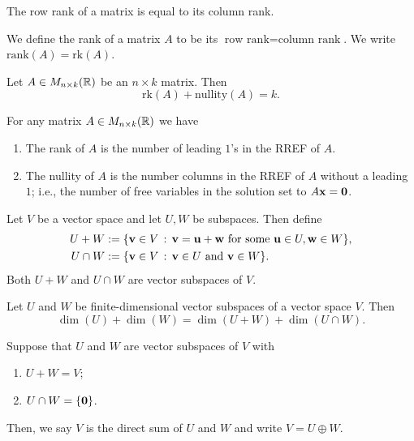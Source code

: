 \documentclass[10pt, a4paper]{article}
\begin{document}
\begin{theorem}
    The row rank of a matrix is equal to its column rank.
\end{theorem}

\begin{definition}[Rank]
    We define the rank of a matrix $A$ to be its $\text{row rank} = \text{column rank}$.
    We write $\mathrm{rank}(A) = \mathrm{rk}(A)$.
\end{definition}

\begin{theorem}
    Let $A \in M_{n \times k}(\mathbb{R})$ be an $n \times k$ matrix.
    Then
    \[
    \mathrm{rk}(A) + \mathrm{nullity}(A) = k.
    \]
\end{theorem}

\begin{corollary}
    For any matrix $A \in M_{n \times k}(\mathbb{R})$ we have
    \begin{enumerate}[label = (\roman*)]
        \item The rank of $A$ is the number of leading $1$'s in the RREF of $A$.
        \item The nullity of $A$ is the number columns in the RREF of $A$ without a leading $1$;
        i.e.,
        the number of free variables in the solution set to $A\mathbf{x} = \mathbf{0}$.
    \end{enumerate}
\end{corollary}

\begin{definition}
    Let $V$ be a vector space and let $U, W$ be subspaces.
    Then define
    \begin{align*}
        U + W &:= \{\mathbf{v} \in V\,:\, \mathbf{v} = \mathbf{u + w}\text{ for some }\mathbf{u} \in U, \mathbf{w} \in W\}, \\
        U \cap W &:= \{\mathbf{v} \in V\,:\, \mathbf{v} \in U\text{ and } \mathbf{v} \in W\}.
    \end{align*}
    Both $U + W$ and $U \cap W$ are vector subspaces of $V$.
\end{definition}

\begin{proposition}
    Let $U$ and $W$ be finite-dimensional vector subspaces of a vector space $V$.
    Then
    \[
    \dim(U) + \dim(W) = \dim(U + W) + \dim(U \cap W).
    \]
\end{proposition}

\begin{definition}
    Suppose that $U$ and $W$ are vector subspaces of $V$ with
    \begin{enumerate}[label = (\roman*)]
        \item $U + W = V$;
        \item $U \cap W = \{\mathbf{0}\}$.
    \end{enumerate}
    Then,
    we say $V$ is the direct sum of $U$ and $W$ and write $V = U \oplus W$.
\end{definition}
\end{document}
